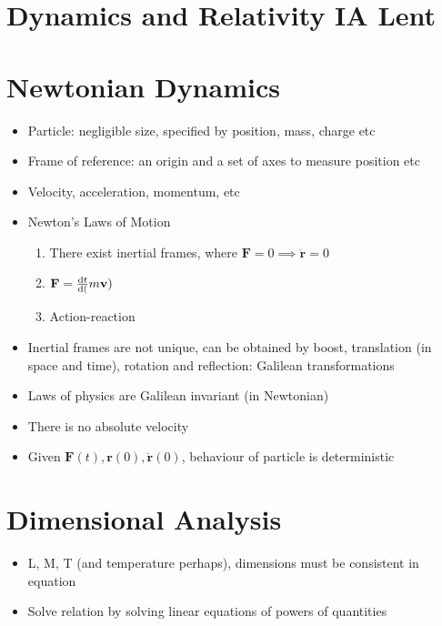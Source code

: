 


\section*{Dynamics and Relativity \hfill IA Lent}

\section{Newtonian Dynamics}
\begin{itemize}
    \item Particle: negligible size, specified by position, mass, charge etc
    \item Frame of reference: an origin and a set of axes to measure position etc
    \item Velocity, acceleration, momentum, etc
    \item Newton's Laws of Motion
          \begin{enumerate}
              \item There exist inertial frames, where $\mathbf{F} = 0 \implies \mathbf{\ddot{r}} = 0$
              \item $\mathbf{F} = \frac{\mathrm{d}{t}}{\mathrm{d}{(}}m\mathbf{v})$
              \item Action-reaction
          \end{enumerate}
    \item Inertial frames are not unique, can be obtained by boost, translation (in space and time), rotation and reflection: Galilean transformations
    \item Laws of physics are Galilean invariant (in Newtonian)
    \item There is no absolute velocity
    \item Given $\mathbf{F}(t), \mathbf{r}(0), \mathbf{\dot{r}}(0)$, behaviour of particle is deterministic

\end{itemize}

\section{Dimensional Analysis}
\begin{itemize}
    \item L, M, T (and temperature perhaps), dimensions must be consistent in equation
    \item Solve relation by solving linear equations of powers of quantities
\end{itemize}

